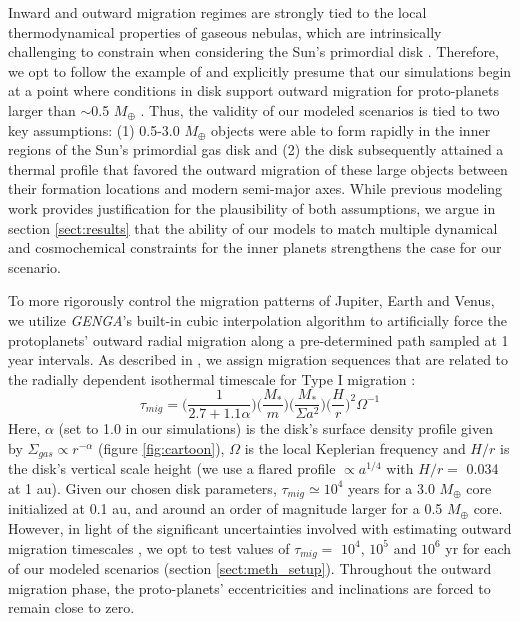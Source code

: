 \documentclass[trackchanges,twocolumn]{aastex}
\begin{document}
Inward and outward migration regimes are strongly tied to the local thermodynamical properties of gaseous nebulas, which are intrinsically challenging to constrain when considering the Sun's primordial disk \citep[e.g.:][]{kley08,lega15,bitch15}.  Therefore, we opt to follow the example of \citet{ray16} and explicitly presume that our simulations begin at a point where conditions in disk support outward migration for proto-planets larger than $\sim$0.5 $M_{\oplus}$ \citep[see, for example, figures 7 and 9 of][]{bitch15}.  Thus, the validity of our modeled scenarios is tied to two key assumptions: (1) 0.5-3.0 $M_{\oplus}$ objects were able to form rapidly in the inner regions of the Sun's primordial gas disk and (2) the disk subsequently attained a thermal profile that favored the outward migration of these large objects between their formation locations and modern semi-major axes.  While previous modeling work provides justification for the plausibility of both assumptions, we argue in section \ref{sect:results} that the ability of our models to match multiple dynamical and cosmochemical constraints for the inner planets strengthens the case for our scenario.
 
 To more rigorously control the migration patterns of Jupiter, Earth and Venus, we utilize \textit{GENGA}'s built-in cubic interpolation algorithm to artificially force the protoplanets' outward radial migration along a pre-determined path sampled at 1 year intervals.  As described in \citet{ray16}, we assign migration sequences that are related to the radially dependent isothermal timescale for Type I migration \citep{tanaka02,paardekooper11}: \begin{equation}
 	\tau_{mig} = \bigg( \frac{1}{2.7 + 1.1\alpha} \bigg) \bigg( \frac{M_{*}}{m} \bigg) \bigg( \frac{M_{*}}{\Sigma a^{2}} \bigg) \bigg( \frac{H}{r} \bigg)^{2} \Omega^{-1}
\label{eqn:tau_mig}
\end{equation}  Here, $\alpha$ (set to 1.0 in our simulations) is the disk's surface density profile given by $\Sigma_{gas} \propto r^{-\alpha}$ (figure \ref{fig:cartoon}), $\Omega$ is the local Keplerian frequency and $H/r$ is the disk's vertical scale height (we use a flared profile $\propto a^{1/4}$ with $H/r=$ 0.034 at 1 au).  Given our chosen disk parameters, $\tau_{mig} \simeq 10^{4}$ years for a 3.0 $M_{\oplus}$ core initialized at 0.1 au, and around an order of magnitude larger for a 0.5 $M_{\oplus}$ core.  However, in light of the significant uncertainties involved with estimating outward migration timescales \citep[e.g.:][]{lega15}, we opt to test values of $\tau_{mig}=$ $10^{4}$, $10^{5}$ and $10^{6}$ yr for each of our modeled scenarios (section \ref{sect:meth_setup}).  Throughout the outward migration phase, the proto-planets' eccentricities and inclinations are forced to remain close to zero.
\end{document}
